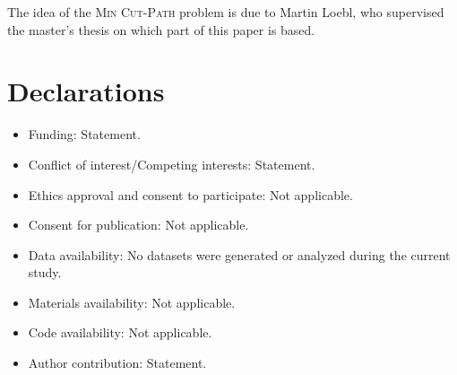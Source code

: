 \documentclass[pdflatex,sn-mathphys-num]{sn-jnl}%
\theoremstyle{thmstyleone}%
\theoremstyle{thmstyletwo}%
\theoremstyle{thmstylethree}%
\newcommand{\MinCutPath}{\textsc{Min Cut-Path}}%
\begin{document}
\backmatter


The idea of the \MinCutPath{} problem is due to Martin Loebl, who supervised the master's thesis on which part of this paper is based.

\section*{Declarations}

\begin{itemize}
\item Funding: Statement.
\item Conflict of interest/Competing interests: Statement.
\item Ethics approval and consent to participate: Not applicable.
\item Consent for publication: Not applicable.
\item Data availability: No datasets were generated or analyzed during the current study.
\item Materials availability: Not applicable.
\item Code availability: Not applicable.
\item Author contribution: Statement.
\end{itemize}


\end{document}
